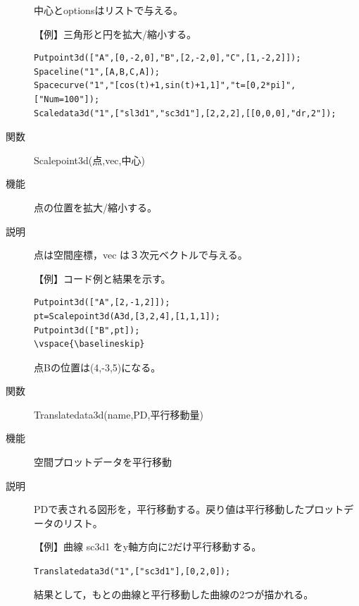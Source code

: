 \documentclass[papersize,a4paper,12pt,uplatex]{jsarticle}
\begin{document}
\begin{description}
中心とoptionsはリストで与える。

\vspace{\baselineskip}
【例】三角形と円を拡大/縮小する。

\begin{verbatim}
Putpoint3d(["A",[0,-2,0],"B",[2,-2,0],"C",[1,-2,2]]);
Spaceline("1",[A,B,C,A]);
Spacecurve("1","[cos(t)+1,sin(t)+1,1]","t=[0,2*pi]",["Num=100"]);
Scaledata3d("1",["sl3d1","sc3d1"],[2,2,2],[[0,0,0],"dr,2"]);
\end{verbatim}

\hspace{20mm}
\vspace{\baselineskip}
\hypertarget{scalepoint3d}{}
\item[関数]Scalepoint3d(点,vec,中心)
\item[機能]点の位置を拡大/縮小する。
\item[説明]点は空間座標，vec は３次元ベクトルで与える。

\vspace{\baselineskip}
【例】コード例と結果を示す。

\begin{verbatim}
Putpoint3d(["A",[2,-1,2]]);
pt=Scalepoint3d(A3d,[3,2,4],[1,1,1]); 
Putpoint3d(["B",pt]);
\vspace{\baselineskip}
\end{verbatim}

点Bの位置は(4,-3,5)になる。


\vspace{\baselineskip}
\hypertarget{translatedata3d}{}
\item[関数]Translatedata3d(name,PD,平行移動量)
\item[機能]空間プロットデータを平行移動
\item[説明]PDで表される図形を，平行移動する。戻り値は平行移動したプロットデータのリスト。

\vspace{\baselineskip}
【例】曲線 sc3d1 をy軸方向に2だけ平行移動する。

\verb|Translatedata3d("1",["sc3d1"],[0,2,0]);|

結果として，もとの曲線と平行移動した曲線の2つが描かれる。


\end{description}
\end{document}
